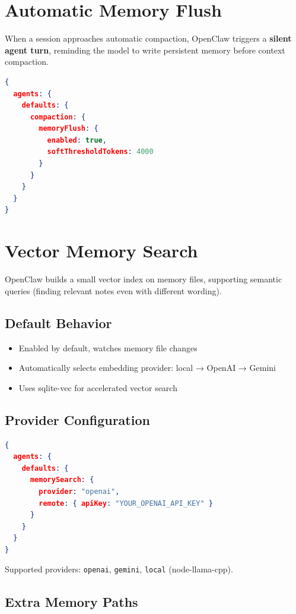 \section{Automatic Memory Flush}

When a session approaches automatic compaction, OpenClaw triggers a \textbf{silent agent turn}, reminding the model to write persistent memory before context compaction.

\begin{lstlisting}[language=json]
{
  agents: {
    defaults: {
      compaction: {
        memoryFlush: {
          enabled: true,
          softThresholdTokens: 4000
        }
      }
    }
  }
}
\end{lstlisting}

\section{Vector Memory Search}

OpenClaw builds a small vector index on memory files, supporting semantic queries (finding relevant notes even with different wording).

\subsection{Default Behavior}

\begin{itemize}
  \item Enabled by default, watches memory file changes
  \item Automatically selects embedding provider: local → OpenAI → Gemini
  \item Uses sqlite-vec for accelerated vector search
\end{itemize}

\subsection{Provider Configuration}

\begin{lstlisting}[language=json]
{
  agents: {
    defaults: {
      memorySearch: {
        provider: "openai",
        remote: { apiKey: "YOUR_OPENAI_API_KEY" }
      }
    }
  }
}
\end{lstlisting}

Supported providers: \texttt{openai}, \texttt{gemini}, \texttt{local} (node-llama-cpp).

\subsection{Extra Memory Paths}

